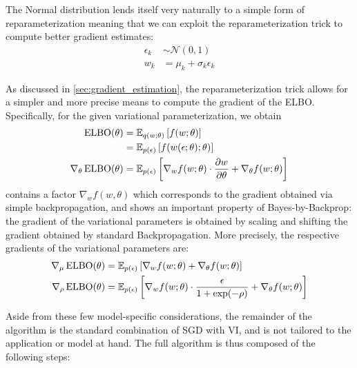 \documentclass[11pt]{article}
\begin{document}
The Normal distribution lends itself very naturally to a simple form of
reparameterization meaning that we can exploit the reparameterization trick to
compute better gradient estimates:
%
\begin{align}
  \epsilon_k &\sim \mathcal{N}(0, 1) \\
  w_k &= \mu_k + \sigma_k \epsilon_k
\end{align}

As discussed in \cref{sec:gradient_estimation}, the reparameterization trick
allows for a simpler and more precise means to compute the gradient of the
ELBO\@.  Specifically, for the given variational parameterization, we obtain
%
\begin{align}
  \operatorname{ELBO}(\theta) &= {\mathbb{E}}_{q(w; \theta)}\left[ f(w; \theta) \right]
  \\
  &= {\mathbb{E}}_{p(\epsilon)}\left[ f(w(\epsilon; \theta); \theta) \right] \\
  \nabla_\theta \operatorname{ELBO}(\theta) &= {\mathbb{E}}_{p(\epsilon)}\left[
    \nabla_w f(w; \theta) \cdot \frac{\partial w}{\partial \theta}
    + \nabla_\theta f(w; \theta) \right] \label{eq:gradient}
\end{align}
%
 contains a factor $\nabla_w f(w, \theta)$ which corresponds
to the gradient obtained via simple backpropagation, and shows an important
property of Bayes-by-Backprop:  the gradient of the variational parameters is
obtained by scaling and shifting the gradient obtained by standard
Backpropagation.  More precisely, the respective gradients of the variational
parameters are:
%
\begin{align}
  \nabla_\mu \operatorname{ELBO}(\theta) &= {\mathbb{E}}_{p(\epsilon)}\left[ \nabla_w
  f(w; \theta) + \nabla_\theta f(w; \theta) \right] \\
  \nabla_\rho \operatorname{ELBO}(\theta) &= {\mathbb{E}}_{p(\epsilon)}\left[ \nabla_w
  f(w; \theta) \cdot \frac{\epsilon}{1+\exp(-\rho)} + \nabla_\theta f(w;
  \theta) \right]
\end{align}

Aside from these few model-specific considerations, the remainder of the
algorithm is the standard combination of SGD with VI, and is not tailored to
the application or model at hand.  The full algorithm is thus composed of the
following steps:
\end{document}
